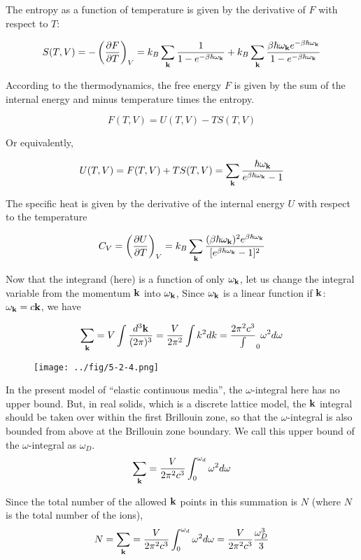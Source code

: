 The entropy as a function of temperature is given by the derivative of $F$ with respect to $T$:

\[S(T,V) = -\left(\frac{\partial F}{\partial T}\right)_V = k_B\sum_{\bf k}\frac{1}{1-e^{-\beta\hbar\omega_{\bf k}}} + k_B\sum_{\bf k}\frac{\beta\hbar\omega_{\bf k}e^{-\beta\hbar\omega_{\bf k}}}{1-e^{-\beta\hbar\omega_{\bf k}}} \]

According to the thermodynamics, the free energy $F$ is given by the sum of the internal energy and minus temperature times the entropy.

\[F(T,V) = U(T,V) - TS(T,V) \]

Or equivalently,

\[U(T,V) = F(T,V) +TS(T,V) = \sum_{\bf k}\frac{\hbar\omega_{\bf k}}{e^{\beta\hbar\omega_{\bf k}} - 1} \]

The specific heat is given by the derivative of the internal energy $U$ with respect to the temperature

\[C_V = \left(\frac{\partial U}{\partial T}\right)_V = k_B\sum_{\bf k}\frac{({\beta\hbar\omega_{\bf k}})^2e^{\beta\hbar\omega_{\bf k}}}{[e^{\beta\hbar\omega_{\bf k}} - 1]^2} \]

Now that the integrand (here) is a function of only $\omega_{\bf k}$, let us change the integral variable from the momentum ${\bf k}$ into $\omega_{\bf k}$, Since $\omega_{\bf k}$ is a linear function if $\bf k$: $\omega_{\bf k} = c\bf k$, we have

\[\sum_{\bf k} = V\int\frac{d^3\bf k}{(2\pi)^3} = \frac{V}{2\pi^2}\int k^2dk = \frac{2\pi^2c^3}\int_0 \omega^2d\omega \]

\begin{wrapfigure}{l}{6cm}
\texttt{[image: ../fig/5-2-4.png]}
\end{wrapfigure}In the present model of ``elastic continuous media'', the $\omega$-integral here has no upper bound. But, in real solids, which is a discrete lattice model, the $\bf k$ integral should be taken over within the first Brillouin zone, so that the $\omega$-integral is also bounded from above at the Brillouin zone boundary. We call this upper bound of the $\omega$-integral as $\omega_D$.
\[\sum_{\bf k} = \frac{V}{2\pi^2c^3}\int_0^{\omega_d}\omega^2d\omega \]

Since the total number of the allowed $\bf k$ points in this summation is $N$ (where $N$ is the total number of the ions),
\[N = \sum_{\bf k} = \frac{V}{2\pi^2c^3}\int_0^{\omega_d}\omega^2d\omega = \frac{V}{2\pi^2c^3}\frac{\omega_D^3}{3} \]

